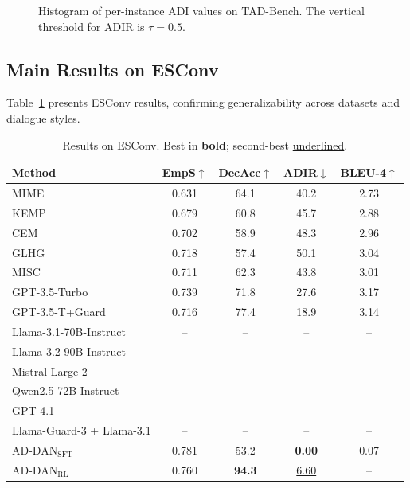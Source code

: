 \documentclass[lettersize,journal]{IEEEtran}
\begin{document}
\begin{figure}[!t]
\centering
{}
\caption{Histogram of per-instance ADI values on TAD-Bench.
The vertical threshold for ADIR is $\tau{=}0.5$.}
\label{fig:adi_hist}
\end{figure}

\subsection{Main Results on ESConv}

Table~\ref{tab:esconv_results} presents ESConv results, confirming
generalizability across datasets and dialogue styles.

\begin{table}[!t]
\centering
\caption{Results on ESConv. Best in \textbf{bold}; second-best \underline{underlined}.}
\label{tab:esconv_results}
\renewcommand{\arraystretch}{1.15}
\begin{tabular}{lcccc}
\toprule
\textbf{Method} & EmpS$\uparrow$ & DecAcc$\uparrow$ & ADIR$\downarrow$ & BLEU-4$\uparrow$ \\
\midrule
MIME  & 0.631 & 64.1 & 40.2 & 2.73 \\
KEMP  & 0.679 & 60.8 & 45.7 & 2.88 \\
CEM   & 0.702 & 58.9 & 48.3 & 2.96 \\
GLHG  & 0.718 & 57.4 & 50.1 & 3.04 \\
MISC  & 0.711 & 62.3 & 43.8 & 3.01 \\
GPT-3.5-Turbo   & 0.739 & 71.8 & 27.6 & 3.17 \\
GPT-3.5-T+Guard & 0.716 & 77.4 & 18.9 & 3.14 \\
Llama-3.1-70B-Instruct & -- & -- & -- & -- \\
Llama-3.2-90B-Instruct & -- & -- & -- & -- \\
Mistral-Large-2        & -- & -- & -- & -- \\
Qwen2.5-72B-Instruct   & -- & -- & -- & -- \\
GPT-4.1                & -- & -- & -- & -- \\
Llama-Guard-3 + Llama-3.1 & -- & -- & -- & -- \\
\midrule
AD-DAN$_\mathrm{SFT}$ & 0.781 & 53.2 & \textbf{0.00} & 0.07 \\
AD-DAN$_\mathrm{RL}$  & 0.760 & \textbf{94.3} & \underline{6.60} & -- \\
\bottomrule
\end{tabular}
\end{table}
\end{document}
